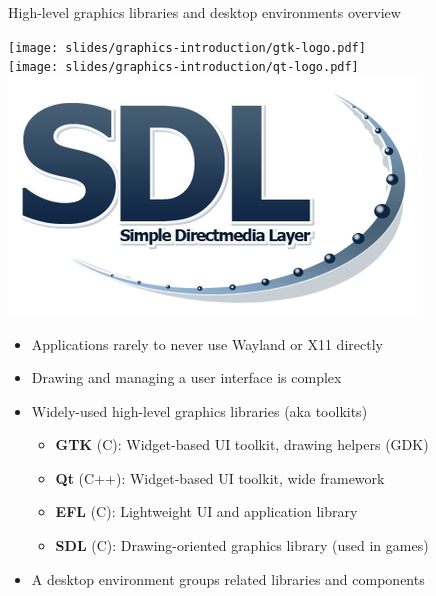\begin{frame}{High-level graphics libraries and desktop environments overview}
  \begin{minipage}[b]{0.09\textwidth}
  \centering
  \texttt{[image: slides/graphics-introduction/gtk-logo.pdf]}\\
  \vspace{3em}
  \texttt{[image: slides/graphics-introduction/qt-logo.pdf]}\\
  \vspace{3em}
  \includegraphics[width=\textwidth]{slides/graphics-introduction/sdl-logo.png}\\
  \vspace{2em}
  \end{minipage}
  \hfill
  \begin{minipage}[b]{0.8\textwidth}
  \begin{itemize}
  \item Applications rarely to never use Wayland or X11 directly
  \item Drawing and managing a user interface is complex
  \item Widely-used high-level graphics libraries (aka toolkits)
    \begin{itemize}
    \item \textbf{GTK} (C): Widget-based UI toolkit, drawing helpers (GDK)
    \item \textbf{Qt} (C++): Widget-based UI toolkit, wide framework
    \item \textbf{EFL} (C): Lightweight UI and application library
    \item \textbf{SDL} (C): Drawing-oriented graphics library (used in games)
    \end{itemize}
  \item A desktop environment groups related libraries and components\\

\end{itemize}
\end{minipage}
\end{frame}
